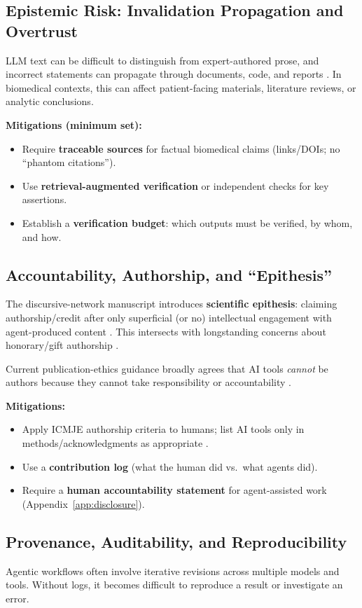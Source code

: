 \documentclass[11pt]{article}
\begin{document}
\subsection{Epistemic Risk: Invalidation Propagation and Overtrust}
LLM text can be difficult to distinguish from expert-authored prose, and incorrect statements can propagate through documents, code, and reports \citep{ji2023survey}. In biomedical contexts, this can affect patient-facing materials, literature reviews, or analytic conclusions.

\textbf{Mitigations (minimum set):}
\begin{itemize}
\item Require \textbf{traceable sources} for factual biomedical claims (links/DOIs; no ``phantom citations'').
\item Use \textbf{retrieval-augmented verification} or independent checks for key assertions.
\item Establish a \textbf{verification budget}: which outputs must be verified, by whom, and how.
\end{itemize}

\subsection{Accountability, Authorship, and ``Epithesis''}
The discursive-network manuscript introduces \textbf{scientific epithesis}: claiming authorship/credit after only superficial (or no) intellectual engagement with agent-produced content \citep{gutierrez2025}. This intersects with longstanding concerns about honorary/gift authorship \citep{marusic2011}.

Current publication-ethics guidance broadly agrees that AI tools \emph{cannot} be authors because they cannot take responsibility or accountability \citep{cope_ai, icmje_authorship, wame2023}.

\textbf{Mitigations:}
\begin{itemize}
\item Apply ICMJE authorship criteria to humans; list AI tools only in methods/acknowledgments as appropriate \citep{icmje_authorship, icmje_ai}.
\item Use a \textbf{contribution log} (what the human did vs.\ what agents did).
\item Require a \textbf{human accountability statement} for agent-assisted work (Appendix~\ref{app:disclosure}).
\end{itemize}

\subsection{Provenance, Auditability, and Reproducibility}
Agentic workflows often involve iterative revisions across multiple models and tools. Without logs, it becomes difficult to reproduce a result or investigate an error.
\end{document}
